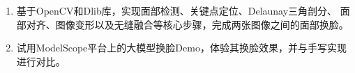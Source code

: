\begin{enumerate}
	\item 基于OpenCV和Dlib库，实现面部检测、关键点定位、Delaunay三角剖分、
	面部对齐、图像变形以及无缝融合等核心步骤，完成两张图像之间的面部换脸。
	\item 试用ModelScope平台上的大模型换脸Demo，体验其换脸效果，并与手写实现进行对比。
\end{enumerate}
